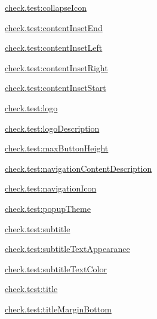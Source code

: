 {\ttfamily \hyperlink{classcheck_1_1test_1_1_r_1_1styleable_a768d406fdf51c661de7d2c032a071146}{check.\+test\+:collapse\+Icon}}

{\ttfamily \hyperlink{classcheck_1_1test_1_1_r_1_1styleable_a2dfa579a4e4d1b7daec868e5ef8667f9}{check.\+test\+:content\+Inset\+End}}

{\ttfamily \hyperlink{classcheck_1_1test_1_1_r_1_1styleable_ab328787f8cee01addd35369b3193085f}{check.\+test\+:content\+Inset\+Left}}

{\ttfamily \hyperlink{classcheck_1_1test_1_1_r_1_1styleable_a03f33bda55e3dc7f0e54ed0c302c497e}{check.\+test\+:content\+Inset\+Right}}

{\ttfamily \hyperlink{classcheck_1_1test_1_1_r_1_1styleable_a9dae7a4f6dfee5c810df77ff15242164}{check.\+test\+:content\+Inset\+Start}}

{\ttfamily \hyperlink{classcheck_1_1test_1_1_r_1_1styleable_a42f433954d5c39edb50f485b83d4bfbd}{check.\+test\+:logo}}

{\ttfamily \hyperlink{classcheck_1_1test_1_1_r_1_1styleable_aa33122c1e3e1e09c60ff7a33506a08d8}{check.\+test\+:logo\+Description}}

{\ttfamily \hyperlink{classcheck_1_1test_1_1_r_1_1styleable_a2a04c6b8bb844f8f793cb6990bd70a78}{check.\+test\+:max\+Button\+Height}}

{\ttfamily \hyperlink{classcheck_1_1test_1_1_r_1_1styleable_ad99d197ecf766148183b75964c1fcb43}{check.\+test\+:navigation\+Content\+Description}}

{\ttfamily \hyperlink{classcheck_1_1test_1_1_r_1_1styleable_a991bcba8e01110fe04b1c4f26bbfccc9}{check.\+test\+:navigation\+Icon}}

{\ttfamily \hyperlink{classcheck_1_1test_1_1_r_1_1styleable_a731a060d7a21c9b47869e797b622fce9}{check.\+test\+:popup\+Theme}}

{\ttfamily \hyperlink{classcheck_1_1test_1_1_r_1_1styleable_a8215e68d4a9819e686f4e4bbe6f2faef}{check.\+test\+:subtitle}}

{\ttfamily \hyperlink{classcheck_1_1test_1_1_r_1_1styleable_a144e9a2b2baf47ad3bc709462b1a5bbb}{check.\+test\+:subtitle\+Text\+Appearance}}

{\ttfamily \hyperlink{classcheck_1_1test_1_1_r_1_1styleable_ac4cc2a3f74200eb561317a2f73280838}{check.\+test\+:subtitle\+Text\+Color}}

{\ttfamily \hyperlink{classcheck_1_1test_1_1_r_1_1styleable_a10fa1bd14d7aa843ac28da6df2e66b54}{check.\+test\+:title}}

{\ttfamily \hyperlink{classcheck_1_1test_1_1_r_1_1styleable_a5e6ae0606eec219fca6a04beab67b4b3}{check.\+test\+:title\+Margin\+Bottom}}


